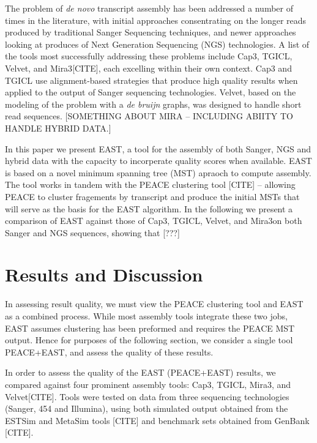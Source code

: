 \documentclass[10pt]{bmc_article}
\newcommand{\peace} {{\small PEACE}}
\newcommand{\capthree} {{\small Cap3}}
\newcommand{\estsim}{{\small ESTSim}}
\newcommand{\metasim} {{\small MetaSim}}
\newcommand{\tgicl} {{\small TGICL}}
\newcommand{\east} {{\small EAST}}
\newcommand{\velvet}{{\small Velvet}}
\newcommand{\mira}{{\small Mira3}}
\newcommand{\peast}{{\small PEACE+EAST}}
\newenvironment{bmcformat}{\begin{raggedright}\baselineskip20pt\sloppy\setboolean{publ}{false}}{\end{raggedright}\baselineskip20pt\sloppy}
\begin{document}
\begin{bmcformat}
The problem of {\it de novo} transcript assembly has been addressed a number
of times in the literature, with initial approaches consentrating on
the longer reads produced by traditional Sanger Sequencing techniques,
and newer approaches looking at produces of Next Generation Sequencing
(NGS) technologies.  A list of the tools most successfully addressing
these problems include \capthree, \tgicl, \velvet, and \mira [CITE],
each excelling within their own context.  \capthree\/ and \tgicl\/ use
alignment-based strategies that produce high quality results when
applied to the output of Sanger sequencing technologies.  \velvet,
based on the modeling of the problem with a {\it de bruijn} graphs,
was designed to handle short read sequences.  [SOMETHING ABOUT MIRA --
INCLUDING ABIITY TO HANDLE HYBRID DATA.]


In this paper we present \east, a tool for the assembly of both
Sanger, NGS and hybrid data with the capacity to incorperate quality
scores when available.  \east\/ is based on a novel minimum spanning
tree (MST) apraoch to compute assembly.  The tool works in tandem with
the \peace\/ clustering tool [CITE] -- allowing \peace\/ to cluster
fragements by transcript and produce the initial MSTs that will serve
as the basis for the \east\/ algorithm.  In the following we present a
comparison of \east\/ against those of \capthree, \tgicl, \velvet, and
\mira on both Sanger and NGS sequences, showing that [???]



 
\section*{Results and Discussion}

In assessing result quality, we must view the \peace\/ clustering tool
\cite{Rao10} and \east\/ as a combined process.  While most assembly
tools integrate these two jobs, \east\/ assumes clustering has been
preformed and requires the \peace\/ MST output.  Hence for purposes of
the following section, we consider a single tool \peast, and
assess the quality of these results.

In order to assess the quality of the \east\/ (\peast\/) results, we compared
against four prominent assembly tools: \capthree, \tgicl,
\mira, and \velvet [CITE].  Tools were tested on data from three
sequencing technologies (Sanger, 454 and Illumina), using both
simulated output obtained from the \estsim\/ and \metasim\/ tools
[CITE] and benchmark sets obtained from GenBank [CITE].  



\end{bmcformat}
\end{document}
